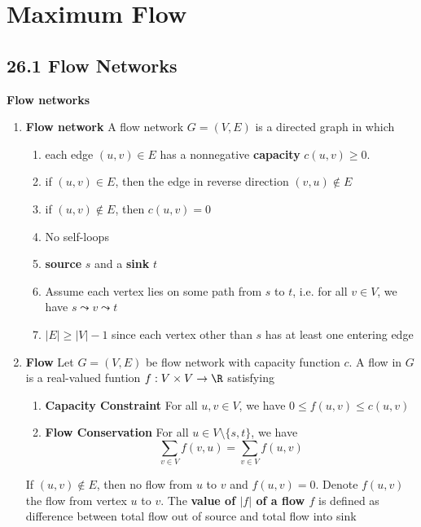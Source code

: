 \documentclass[11pt]{article}
\begin{document}
\section*{Maximum Flow}


\subsection*{26.1 Flow Networks}

\begin{defn*}
    \textbf{Flow networks}
    \begin{enumerate}
        \item \textbf{Flow network} A flow network $G = (V,E)$ is a directed graph in which 
        \begin{enumerate}
            \item each edge $(u,v) \in E$ has a nonnegative \textbf{capacity} $c(u,v) \geq 0$.
            \item if $(u,v) \in E$, then the edge in reverse direction $(v,u) \not\in E$
            \item if $(u,v) \not\in E$, then $c(u,v) = 0$
            \item No self-loops
            \item \textbf{source} $s$ and a \textbf{sink} $t$
            \item Assume each vertex lies on some path from $s$ to $t$, i.e. for all $v\in V$, we have $s \leadsto v \leadsto t$
            \item $|E| \geq |V| - 1$ since each vertex other than $s$ has at least one entering edge
        \end{enumerate}
        \item \textbf{Flow} Let $G =  (V,E)$ be flow network with capacity function $c$. A flow in $G$ is a real-valued funtion $f: V\times V \to \R$ satisfying
        \begin{enumerate}
            \item \textbf{Capacity Constraint} For all $u,v \in V$, we have $0 \leq f(u,v) \leq c(u,v)$
             \item \textbf{Flow Conservation} For all $u\in V \setminus \{ s,t\}$, we have 
             \[
                \sum_{v\in V} f(v,u) = \sum_{v\in V} f(u,v)
             \]
        \end{enumerate}
        If $(u,v) \not\in E$, then no flow from $u$ to $v$ and $f(u,v) = 0$. Denote $f(u,v)$ the flow from vertex $u$ to $v$. The \textbf{value of $|f|$ of a flow $f$} is defined as difference between total flow out of source and total flow into sink

\end{enumerate}
\end{defn*}
\end{document}
